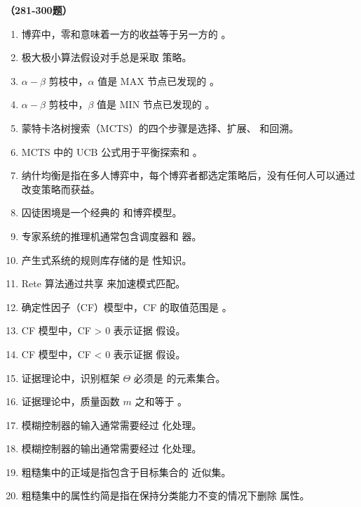 \vspace{1em}
\textbf{（281-300题）}
\begin{enumerate}[resume,leftmargin=2em,itemsep=1pt]
\item 博弈中，零和意味着一方的收益等于另一方的 \underline{\hspace{3em}}。
\item 极大极小算法假设对手总是采取 \underline{\hspace{3em}} 策略。
\item $\alpha-\beta$ 剪枝中，$\alpha$ 值是 MAX 节点已发现的 \underline{\hspace{3em}}。
\item $\alpha-\beta$ 剪枝中，$\beta$ 值是 MIN 节点已发现的 \underline{\hspace{3em}}。
\item 蒙特卡洛树搜索（MCTS）的四个步骤是选择、扩展、\underline{\hspace{3em}} 和回溯。
\item MCTS 中的 UCB 公式用于平衡探索和 \underline{\hspace{3em}}。
\item 纳什均衡是指在多人博弈中，每个博弈者都选定策略后，没有任何人可以通过 \underline{\hspace{3em}} 改变策略而获益。
\item 囚徒困境是一个经典的 \underline{\hspace{3em}} 和博弈模型。
\item 专家系统的推理机通常包含调度器和 \underline{\hspace{3em}} 器。
\item 产生式系统的规则库存储的是 \underline{\hspace{3em}} 性知识。
\item Rete 算法通过共享 \underline{\hspace{3em}} 来加速模式匹配。
\item 确定性因子（CF）模型中，CF 的取值范围是 \underline{\hspace{3em}}。
\item CF 模型中，CF > 0 表示证据 \underline{\hspace{3em}} 假设。
\item CF 模型中，CF < 0 表示证据 \underline{\hspace{3em}} 假设。
\item 证据理论中，识别框架 $\Theta$ 必须是 \underline{\hspace{3em}} 的元素集合。
\item 证据理论中，质量函数 $m$ 之和等于 \underline{\hspace{3em}}。
\item 模糊控制器的输入通常需要经过 \underline{\hspace{3em}} 化处理。
\item 模糊控制器的输出通常需要经过 \underline{\hspace{3em}} 化处理。
\item 粗糙集中的正域是指包含于目标集合的 \underline{\hspace{3em}} 近似集。
\item 粗糙集中的属性约简是指在保持分类能力不变的情况下删除 \underline{\hspace{3em}} 属性。
\end{enumerate}


